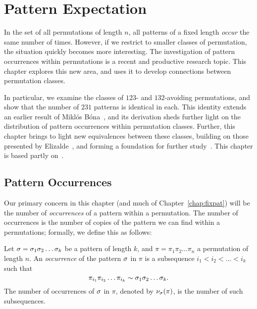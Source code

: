 \chapter{Pattern Expectation}
\label{chap:expat}
  
  In the set of all permutations of length $n$, all patterns of a fixed length 
  \emph{occur} the same number of times. However, if we restrict to smaller
  classes of permutation, the situation quickly becomes more interesting.  The
  investigation of pattern occurrences within permutations is a recent and
  productive research topic. This chapter explores this new area, and uses it
  to develop connections between permutation classes. 
  
  In particular, we examine the classes of $123$- and $132$-avoiding
  permutations, and show that the number of $231$ patterns is identical in each.
  This identity extends an earlier result of Mikl\'os B\'ona~\cite{Bona2012},
  and its derivation sheds further light on the distribution of pattern
  occurrences within permutation classes. Further, this chapter brings to light
  new equivalences between these classes, building on those presented by
  Elizalde~\cite{sergithesis}, and forming a foundation for
  further study~\cite{Elizalde2013, Rudolph2013, Janson2014}.  This chapter is
  based partly on~\cite{me-expat}.

\section{Pattern Occurrences}
\label{expat:occurrences}
  
  Our primary concern in this chapter (and much of Chapter~\ref{chap:fixpat})
  will be the number of \emph{occurrences} of a pattern within a permutation.
  The number of occurrences is the number of copies of the pattern we can
  find within a permutations; formally, we define this as follows: 
  
  \begin{definition} \label{def:occurrence} 
    Let $\sigma = \sigma_1 \sigma_2 \dots \sigma_k$ be a pattern of length $k$, and $\pi =
    \pi_1 \pi_2 \dots \pi_n$ a permutation of length $n$. An \emph{occurrence} of the
    pattern $\sigma$ in $\pi$ is a subsequence $i_1 < i_2 < \dots < i_k$ such
    that 
    $$ \pi_{i_1} \pi_{i_2} \dots \pi_{i_k} \sim \sigma_1 \sigma_2 \dots \sigma_k. $$ 
    The number of occurrences of $\sigma$ in $\pi$, denoted by $\nu_\sigma(\pi)$, is
    the number of such subsequences.  
  \end{definition}
    
